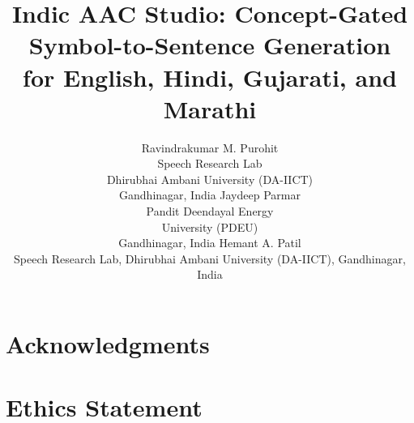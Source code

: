 \documentclass[11pt]{article}
\title{Indic AAC Studio: Concept-Gated Symbol-to-Sentence Generation\\
for English, Hindi, Gujarati, and Marathi}
\author{Ravindrakumar M. Purohit \\
  Speech Research Lab \\
  Dhirubhai Ambani University (DA-IICT) \\
  Gandhinagar, India
  \And
  Jaydeep Parmar \\
  Pandit Deendayal Energy \\
  University (PDEU) \\
  Gandhinagar, India
  \AND
  Hemant A. Patil \\
  Speech Research Lab, Dhirubhai Ambani University (DA-IICT), Gandhinagar, India}
\begin{document}
\maketitle






\section*{Acknowledgments}

\section*{Ethics Statement}



\newpage
\appendix

\end{document}
